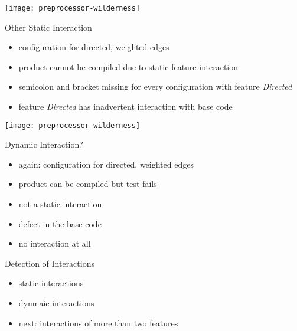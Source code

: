 \begin{frame}{\myframetitle}
	\begin{mycolumns}[widths={75}]
		\texttt{[image: preprocessor-wilderness]}
	\mynextcolumn
		\begin{example}{Other Static Interaction}\setlength\leftmargini{3mm}
			\begin{itemize}
				\item configuration for directed, weighted edges
				\item product cannot be compiled due to static feature interaction
				\item semicolon and bracket missing for every configuration with feature \emph{Directed}
				\item feature \emph{Directed} has inadvertent interaction with base code
			\end{itemize}
		\end{example}
	\end{mycolumns}
\end{frame}
\begin{frame}{\myframetitle}\setlength\leftmargini{3mm}
	\begin{mycolumns}[widths={70}]
		\texttt{[image: preprocessor-wilderness]}
	\mynextcolumn
		\begin{example}{Dynamic Interaction?}
			\begin{itemize}
				\item again: configuration for directed, weighted edges
				\item product can be compiled but test fails
				\item not a static interaction
				\item defect in the base code
				\item no interaction at all
			\end{itemize}
		\end{example}
		\begin{note}{Detection of Interactions}
			\begin{itemize}
				\item static interactions \lectureanalyses
				\item dynmaic interactions \lecturetesting
				\item next: interactions of more than two features
			\end{itemize}
		\end{note}
	\end{mycolumns}
\end{frame}


